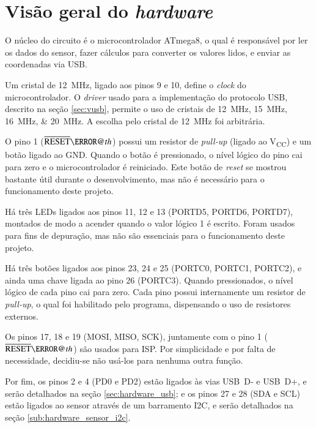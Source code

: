 \documentclass[brazil,pagestart=firstchapter]{abnt}
\makeatletter
\newcommand*{\textoverline}[1]{$\overline{\hbox{#1}}\m@th$}
\newcommand*{\VCC}{V\textsubscript{CC}\xspace}
\newcommand*{\GND}{GND\xspace}
\makeatother
\begin{document}
\newpage


\section{Visão geral do \textit{hardware}}
\label{sec:hardware_visao_geral}

O núcleo do circuito é o microcontrolador ATmega8, o qual é responsável por
ler os dados do sensor, fazer cálculos para converter os valores lidos, e
enviar as coordenadas via \ac{USB}.

Um cristal de \SI{12}{\mega\hertz}, ligado aos pinos 9 e 10, define o
\textit{clock} do microcontrolador. O \textit{driver} usado para a
implementação do protocolo \ac{USB}, descrito na seção \ref{sec:vusb},
permite o uso de cristais de \SIlist[list-final-separator={ ou }]{12; 15;
16; 20}{\mega\hertz}. A escolha pelo cristal de \SI{12}{\mega\hertz} foi
arbitrária.

O pino 1 (\textoverline{RESET}) possui um resistor de \textit{pull-up}
(ligado ao \VCC) e um botão ligado ao \GND. Quando o botão é pressionado, o
nível lógico do pino cai para zero e o microcontrolador é reiniciado. Este
botão de \textit{reset} se mostrou bastante útil durante o desenvolvimento,
mas não é necessário para o funcionamento deste projeto.

Há três \acp{LED} ligados aos pinos 11, 12 e 13 (PORTD5, PORTD6, PORTD7),
montados de modo a acender quando o valor lógico 1 é escrito. Foram usados
para fins de depuração, mas não são essenciais para o funcionamento deste
projeto.

Há três botões ligados aos pinos 23, 24 e 25 (PORTC0, PORTC1, PORTC2), e
ainda uma chave ligada ao pino 26 (PORTC3). Quando pressionados, o nível
lógico de cada pino cai para zero. Cada pino possui internamente um resistor
de \textit{pull-up}, o qual foi habilitado pelo programa, dispensando o uso
de resistores externos.

Os pinos 17, 18 e 19 (MOSI, MISO, SCK), juntamente com o pino 1
(\textoverline{RESET}) são usados para \ac{ISP}. Por simplicidade e por
falta de necessidade, decidiu-se não usá-los para nenhuma outra função.

Por fim, os pinos 2 e 4 (PD0 e PD2) estão ligados às vias USB~D- e USB~D+, e
serão detalhados na seção \ref{sec:hardware_usb}; e os pinos 27 e 28 (SDA e
SCL) estão ligados ao sensor através de um barramento \ac{I2C}, e serão
detalhados na seção \ref{sub:hardware_sensor_i2c}.
\end{document}
